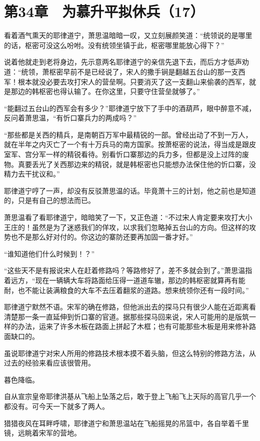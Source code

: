 \section{第34章　为慕升平拟休兵（17）}

看着酒气熏天的耶律道宁，萧思温暗暗一叹，又立刻展颜笑道：“统领说的是哪里的话，枢密可没这么吩咐。没有统领坐镇于此，枢密哪里能放心得下？”

说着他就走到老将身边，先示意两名耶律道宁的亲信先退下去，而后方才低声劝道：“统领，萧枢密早前不是已经说了，宋人的撒手锏是翻越五台山的那一支西军！根本就没必要去攻打宋人的营垒啊。只要消灭了这一支翻山来偷袭的西军，就是那边的韩枢密也得认输了。在你这里，只要守住营垒就够了。”

“能翻过五台山的西军会有多少？”耶律道宁放下了手中的酒葫芦，眼中醉意不减，反问着萧思温，“有忻口寨兵力的两成吗？”

“那些都是关西的精兵，是南朝百万军中最精锐的一部。曾经出动了不到一万人，就在半年之内灭亡了一个有十万兵马的南方国家。按萧枢密的说法，得当成是跟皮室军、宫分军一样的精锐看待。别看忻口寨那边的兵力多，但都是没上过阵的废物。真要丢光了关西那边来的精锐，就是韩枢密也只能想办法保住他的忻口寨，没精力去干扰议和。”

耶律道宁哼了一声，却没有反驳萧思温的话。毕竟萧十三的计划，他之前也是知道的，只是有自己的想法而已。

萧思温看了看耶律道宁，暗暗笑了一下，又正色道：“不过宋人肯定要来攻打大小王庄的！虽然是为了迷惑我们的佯攻，以求我们忽略掉五台山的方向。但这样的攻势也不是那么好对付的。你这边的寨防还要再加固一番才好。”

“谁知道他们什么时候到！？”

“这些天不是有报说宋人在赶着修路吗？等路修好了，差不多就会到了。”萧思温指着远方，“现在一辆辆大车将路面给压得一道道车辙，那边的韩枢密就算再有能耐，也不能让装满粮食的大车不去压着翻浆的道路。想来统领你还有一段时间。”

耶律道宁默然不语。宋军的确在修路，但他派出去的探马只有很少人能在近距离看清楚那一条一直延伸到忻口寨的官道。据那些探马回来说，宋人可能用的是版筑一样的办法，运来了许多木板在路面上拼起了木框；也有可能那些木板是用来修补路面缺口的。

虽说耶律道宁对宋人所用的修路技术根本摸不着头脑，但这么特别的修路方法，从过去的经验来看应该很管用。

暮色降临。

自从宣宗皇帝耶律洪基从飞船上坠落之后，敢于登上飞船飞上天际的高官几乎一个都没有。可今天一下就多了两人。

猎猎夜风在耳畔呼啸，耶律道宁和萧思温站在飞船摇晃的吊篮中，各自举着千里镜，远眺着宋军的营地。

